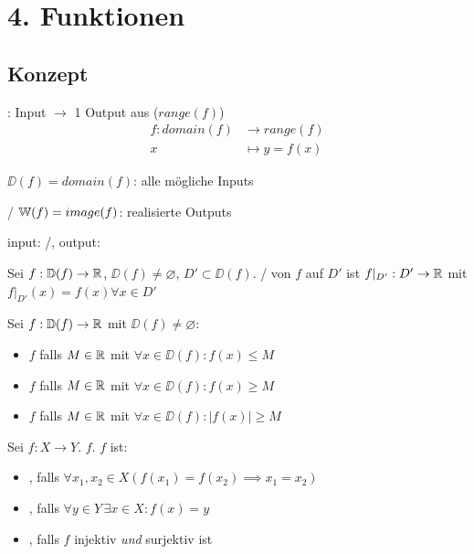 \section{4. Funktionen}

\subsection{Konzept}

\Def {}: Input $\to$ 1 Output aus  ($range(f)$)
\begin{align*}
    f: domain(f) & \to range(f) \\
    x & \mapsto y = f(x)
\end{align*}

\Def {} $\DD(f) = domain(f)$: alle mögliche Inputs

\Def {}/ $\mathbb{W}(f) = image(f)$: realisierte Outputs

\Def input: /, output: 

\Def Sei $f: \mathbb{D}(f) \to \mathbb{R}$, $\DD(f)\ne \varnothing$, $D' \subset \DD(f)$.
/ von $f$ auf $D'$ ist $f\rvert_{D'} : D' \to \mathbb{R}$
mit $f\rvert_{D'}(x) = f(x) \forall x \in D'$

\Def Sei $f : \mathbb{D}(f) \to \mathbb{R}$ mit $\DD(f)\ne \varnothing$:
\vspace{-0.6em}
\begin{itemize}
    \item $f$  falls $M \in \mathbb{R}$ mit $\forall x \in \DD(f) : f(x)\le M$
    \item $f$  falls $M \in \mathbb{R}$ mit $\forall x \in \DD(f) : f(x)\ge M$
    \item $f$  falls $M \in \mathbb{R}$ mit $\forall x \in \DD(f) : |f(x)|\ge M$
\end{itemize}

\Def Sei $f : X \to Y$. $f$. $f$ ist:
\vspace{-0.6em}
\begin{itemize}
    \item {}, falls $\forall x_1, x_2 \in X (f(x_1) = f(x_2) \implies x_1 = x_2)$
    \item {}, falls $\forall y \in Y \, \exists x \in X : f(x) = y$
    \item {}, falls $f$ injektiv \textit{und} surjektiv ist
\end{itemize}

